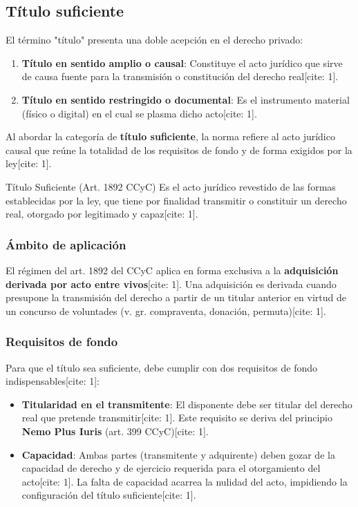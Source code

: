\documentclass[12pt,oneside]{book}
\begin{document}
\subsection{Título suficiente}

El término "título" presenta una doble acepción en el derecho privado:

\begin{enumerate}
    \item \textbf{Título en sentido amplio o causal}: Constituye el acto jurídico que sirve de causa fuente para la transmisión o constitución del derecho real[cite: 1].
    \item \textbf{Título en sentido restringido o documental}: Es el instrumento material (físico o digital) en el cual se plasma dicho acto[cite: 1].
\end{enumerate}

Al abordar la categoría de \textbf{título suficiente}, la norma refiere al acto jurídico causal que reúne la totalidad de los requisitos de fondo y de forma exigidos por la ley[cite: 1].

\begin{definition}{Título Suficiente (Art. 1892 CCyC)}
Es el acto jurídico revestido de las formas establecidas por la ley, que tiene por finalidad transmitir o constituir un derecho real, otorgado por legitimado y capaz[cite: 1].
\end{definition}

\subsubsection{Ámbito de aplicación}
El régimen del art. 1892 del CCyC aplica en forma exclusiva a la \textbf{adquisición derivada por acto entre vivos}[cite: 1]. Una adquisición es derivada cuando presupone la transmisión del derecho a partir de un titular anterior en virtud de un concurso de voluntades (v. gr. compraventa, donación, permuta)[cite: 1].

\subsubsection{Requisitos de fondo}
Para que el título sea suficiente, debe cumplir con dos requisitos de fondo indispensables[cite: 1]:

\begin{itemize}
    \item \textbf{Titularidad en el transmitente}: El disponente debe ser titular del derecho real que pretende transmitir[cite: 1]. Este requisito se deriva del principio \textbf{Nemo Plus Iuris} (art. 399 CCyC)[cite: 1].
    \item \textbf{Capacidad}: Ambas partes (transmitente y adquirente) deben gozar de la capacidad de derecho y de ejercicio requerida para el otorgamiento del acto[cite: 1]. La falta de capacidad acarrea la nulidad del acto, impidiendo la configuración del título suficiente[cite: 1].
\end{itemize}
\end{document}
